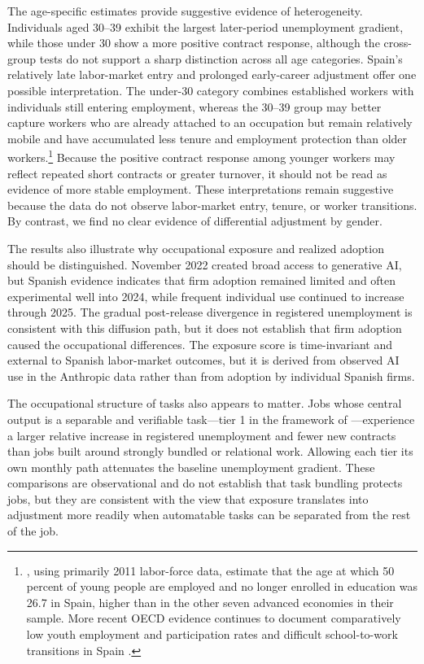 The age-specific estimates provide suggestive evidence of heterogeneity. Individuals aged 30--39 exhibit the largest later-period unemployment gradient, while those under 30 show a more positive contract response, although the cross-group tests do not support a sharp distinction across all age categories. Spain's relatively late labor-market entry and prolonged early-career adjustment offer one possible interpretation. The under-30 category combines established workers with individuals still entering employment, whereas the 30--39 group may better capture workers who are already attached to an occupation but remain relatively mobile and have accumulated less tenure and employment protection than older workers.\footnote{\citet{quintini_martin_2014}, using primarily 2011 labor-force data, estimate that the age at which 50 percent of young people are employed and no longer enrolled in education was 26.7 in Spain, higher than in the other seven advanced economies in their sample. More recent OECD evidence continues to document comparatively low youth employment and participation rates and difficult school-to-work transitions in Spain \citep{oecd_spain_2023}.} Because the positive contract response among younger workers may reflect repeated short contracts or greater turnover, it should not be read as evidence of more stable employment. These interpretations remain suggestive because the data do not observe labor-market entry, tenure, or worker transitions. By contrast, we find no clear evidence of differential adjustment by gender.

The results also illustrate why occupational exposure and realized adoption should be distinguished. November 2022 created broad access to generative AI, but Spanish evidence indicates that firm adoption remained limited and often experimental well into 2024, while frequent individual use continued to increase through 2025. The gradual post-release divergence in registered unemployment is consistent with this diffusion path, but it does not establish that firm adoption caused the occupational differences. The exposure score is time-invariant and external to Spanish labor-market outcomes, but it is derived from observed AI use in the Anthropic data rather than from adoption by individual Spanish firms.

The occupational structure of tasks also appears to matter. Jobs whose central output is a separable and verifiable task---tier 1 in the framework of \citet{garicano2026messy}---experience a larger relative increase in registered unemployment and fewer new contracts than jobs built around strongly bundled or relational work. Allowing each tier its own monthly path attenuates the baseline unemployment gradient. These comparisons are observational and do not establish that task bundling protects jobs, but they are consistent with the view that exposure translates into adjustment more readily when automatable tasks can be separated from the rest of the job.

